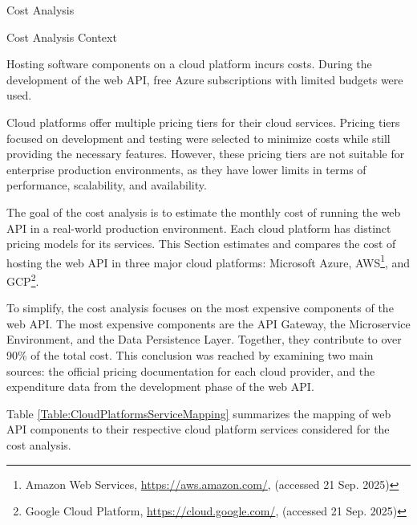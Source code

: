 \documentclass[12pt, reqno]{amsbook}
\makeatletter
\def\section{\@startsection{section}{1}%
      \z@{.5\linespacing\@plus.7\linespacing}{.25\linespacing}%
      {\normalfont\bfseries\flushleft}}
\def\subsection{\@startsection{subsection}{2}%
      \z@{.5\linespacing\@plus.7\linespacing}{.25\linespacing}%
      {\normalfont\bfseries\flushleft}}
\theoremstyle{definition}
\theoremstyle{definition}
\numberwithin{section}{chapter}
\numberwithin{table}{chapter}
\numberwithin{figure}{chapter}
\makeatother
\begin{document}
\section{Cost Analysis}
\label{Section:Cost_Analysis}

\subsection{Cost Analysis Context}
\label{Subsection:Cost_Analysis_Context}

Hosting software components on a cloud platform incurs costs. During the development of the web \ac{API}, free Azure subscriptions with limited budgets were used.

Cloud platforms offer multiple pricing tiers for their cloud services. Pricing tiers focused on development and testing were selected to minimize costs while still providing the necessary features. However, these pricing tiers are not suitable for enterprise production environments, as they have lower limits in terms of performance, scalability, and availability.

The goal of the cost analysis is to estimate the monthly cost of running the web \ac{API} in a real-world production environment. Each cloud platform has distinct pricing models for its services. This Section estimates and compares the cost of hosting the web \ac{API} in three major cloud platforms: Microsoft Azure, \ac{AWS}\footnote{Amazon Web Services, \url{https://aws.amazon.com/}, (accessed 21 Sep. 2025)}, and \ac{GCP}\footnote{Google Cloud Platform, \url{https://cloud.google.com/}, (accessed 21 Sep. 2025)}.

To simplify, the cost analysis focuses on the most expensive components of the web \ac{API}. The most expensive components are the \ac{API} Gateway, the Microservice Environment, and the Data Persistence Layer. Together, they contribute to over 90\% of the total cost. This conclusion was reached by examining two main sources: the official pricing documentation for each cloud provider, and the expenditure data from the development phase of the web \ac{API}.

Table \ref{Table:CloudPlatformsServiceMapping} summarizes the mapping of web \ac{API} components to their respective cloud platform services considered for the cost analysis.
\end{document}
